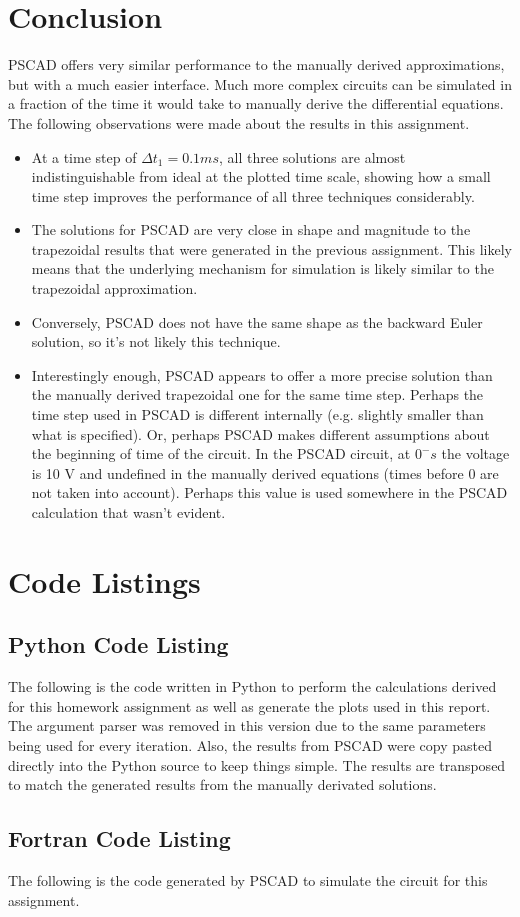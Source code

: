 \documentclass[10pt, oneside, letterpaper]{article}
\begin{document}
\section{Conclusion}
PSCAD offers very similar performance to the manually derived approximations, but with a much easier interface. Much more complex circuits can be simulated in a fraction of the time it would take to manually derive the differential equations. The following observations were made about the results in this assignment.
\begin{itemize}
    \item At a time step of $\Delta{}t_1 = 0.1 ms$, all three solutions are almost indistinguishable from ideal at the plotted time scale, showing how a small time step improves the performance of all three techniques considerably.
    \item The solutions for PSCAD are very close in shape and magnitude to the trapezoidal results that were generated in the previous assignment. This likely means that the underlying mechanism for simulation is likely similar to the trapezoidal approximation.
    \item Conversely, PSCAD does not have the same shape as the backward Euler solution, so it's not likely this technique.
    \item Interestingly enough, PSCAD appears to offer a more precise solution than the manually derived trapezoidal one for the same time step. Perhaps the time step used in PSCAD is different internally (e.g. slightly smaller than what is specified). Or, perhaps PSCAD makes different assumptions about the beginning of time of the circuit. In the PSCAD circuit, at $0^-s$ the voltage is 10 V and undefined in the manually derived equations (times before 0 are not taken into account). Perhaps this value is used somewhere in the PSCAD calculation that wasn't evident.

\end{itemize}

\newpage
\section{Code Listings}

\subsection{Python Code Listing}
\label{code-listing-python}
The following is the code written in Python to perform the calculations derived for this homework assignment as well as generate the plots used in this report. The argument parser was removed in this version due to the same parameters being used for every iteration. Also, the results from PSCAD were copy pasted directly into the Python source to keep things simple. The results are transposed to match the generated results from the manually derivated solutions.


\subsection{Fortran Code Listing}
\label{code-listing-fortran}
The following is the code generated by PSCAD to simulate the circuit for this assignment.

\end{document}
